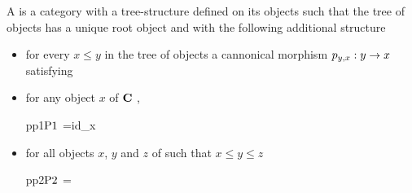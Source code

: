 \begin{definition}
A   is a category \catcw with a tree-structure defined on its objects 
such that the tree of objects has a unique root object
and  with  the following additional structure
\begin{itemize}
\item  for every $x \leq y$ in the tree of objects  a cannonical morphism $p_{y,x} :y \rightarrow x$
satisfying
\item for any object $x$ of $\textbf{C}\ $,
\begin{axiomtagged}{pp1}{$\pbartag{1}$}
=id_x
\end{axiomtagged}
\item for all objects $x$, $y$ and $z$ of \catcw such that $x \leq y \leq z$
\begin{axiomtagged}{pp2}{$\pbartag{2}$}
 \circ {} = 
\end{axiomtagged}
\end{itemize}



\end{definition}
